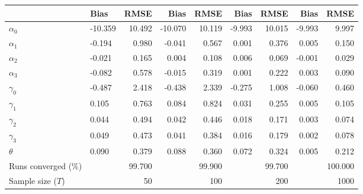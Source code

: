 
\begin{tabular}[t]{llrrrrrrr}
\toprule
  & Bias & RMSE & Bias & RMSE & Bias & RMSE & Bias & RMSE\\
\midrule
$\alpha_{0}$ & -10.359 & 10.492 & -10.070 & 10.119 & -9.993 & 10.015 & -9.993 & 9.997\\
$\alpha_{1}$ & -0.194 & 0.980 & -0.041 & 0.567 & 0.001 & 0.376 & 0.005 & 0.150\\
$\alpha_{2}$ & -0.021 & 0.165 & 0.004 & 0.108 & 0.006 & 0.069 & -0.001 & 0.029\\
$\alpha_{3}$ & -0.082 & 0.578 & -0.015 & 0.319 & 0.001 & 0.222 & 0.003 & 0.090\\
$\gamma_{0}$ & -0.487 & 2.418 & -0.438 & 2.339 & -0.275 & 1.008 & -0.060 & 0.460\\
$\gamma_{1}$ & 0.105 & 0.763 & 0.084 & 0.824 & 0.031 & 0.255 & 0.005 & 0.105\\
$\gamma_{2}$ & 0.044 & 0.494 & 0.042 & 0.446 & 0.018 & 0.171 & 0.003 & 0.074\\
$\gamma_{3}$ & 0.049 & 0.473 & 0.041 & 0.384 & 0.016 & 0.179 & 0.002 & 0.078\\
$\theta$ & 0.090 & 0.379 & 0.088 & 0.360 & 0.072 & 0.324 & 0.005 & 0.212\\
Runs converged (\%) &  & 99.700 &  & 99.900 &  & 99.700 &  & 100.000\\
Sample size ($T$) &  & 50 &  & 100 &  & 200 &  & 1000\\
\bottomrule
\end{tabular}
